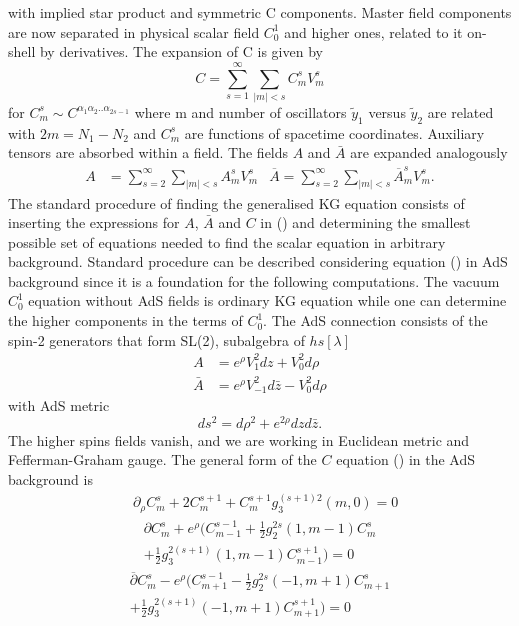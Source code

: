 \documentclass[prd,superscriptaddress,twocolumn,10pt]{revtex4}
\begin{document}
 with implied star product and symmetric C components.
  Master field components are now separated in physical scalar field $C_0^1$  and higher ones, related to it on-shell by derivatives. 
The expansion of C is given by
\begin{equation}
C=\sum_{s=1}^{\infty}\sum_{|m|<s}C_m^sV_m^s
\end{equation}
for $C_m^s\sim C^{\alpha_1\alpha_2..\alpha_{2s-1}}$
where m and number of oscillators $\tilde{y}_{1}$ versus $\tilde{y}_2$ are related with $2m=N_1-N_2$ and $C_m^s$ are functions of spacetime coordinates. Auxiliary tensors are absorbed within a field.
The fields $A$ and $\bar{A}$ are expanded analogously
\begin{align}
A&=\sum_{s=2}^{\infty}\sum_{|m|<s}A_m^sV_m^s & \overline{A}=\sum_{s=2}^{\infty}\sum_{|m|<s}\overline{A}_m^sV_m^s.
\end{align}
The standard procedure of finding the generalised KG equation consists of inserting the expressions for $A$, $\bar{A}$ and $C$ in  () and determining the smallest possible set of equations needed to find the scalar equation in arbitrary background.
Standard procedure can be described considering equation () in AdS background since it is a foundation for the following computations. The vacuum $C_0^1$ equation without AdS fields is ordinary KG  equation while one can determine the higher components in the terms of $C_0^1$. 
The AdS connection consists of the spin-2 generators that form SL(2), subalgebra of $hs[\lambda]$ 
\begin{align}
A&=e^{\rho}V_1^2dz+V_0^2d\rho\\
\bar{A}&=e^{\rho}V_{-1}^2d\bar{z}-V_0^2d\rho
\end{align}
with AdS metric
\begin{equation}
ds^2=d\rho^2+e^{2\rho}dzd\bar{z}. 
\end{equation}
The higher spins fields vanish, and we are working in Euclidean metric and  Fefferman-Graham gauge. The general form of the $C$ equation () in the AdS background is 
\begin{align}
&\partial_{\rho}C_m^s+2C_m^{s+1}+C_m^{s+1}g_3^{(s+1)2}(m,0)=0  \end{align}
\begin{align}
 \partial C_m^s+e^{\rho}(C_{m-1}^{s-1}+\frac{1}{2}g_2^{2s}(1,m-1)C^s_m\\ \nonumber+\frac{1}{2}g_3^{2(s+1)}(1,m-1)C_{m-1}^{s+1})=0 \end{align}
\begin{align}
\overline{\partial}C^s_m-e^{\rho}( C_{m+1}^{s-1}-\frac{1}{2}g_2^{2s}(-1,m+1)C^s_{m+1}\\+\frac{1}{2}g_3^{2(s+1)}(-1,m+1)C^{s+1}_{m+1})=0 \nonumber
\end{align}
\end{document}
